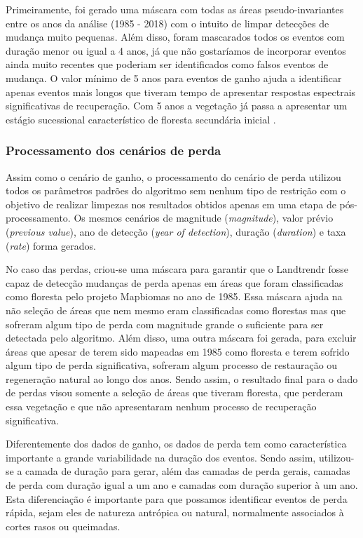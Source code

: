 \documentclass[12pt,a4paper]{article}
\begin{document}
Primeiramente, foi gerado uma máscara com todas as áreas pseudo-invariantes entre os anos da análise (1985 - 2018) com o intuito de limpar detecções de mudança muito pequenas. Além disso, foram mascarados todos os eventos com duração menor ou igual a 4 anos, já que não gostaríamos de incorporar eventos ainda muito recentes que poderiam ser identificados como falsos eventos de mudança. O valor mínimo de 5 anos para eventos de ganho ajuda a identificar apenas eventos mais longos que tiveram tempo de apresentar respostas espectrais significativas de recuperação. Com 5 anos a vegetação já passa a apresentar um estágio sucessional característico de floresta secundária inicial \citep{Chazdon2014}. 

\subsubsection{Processamento dos cenários de perda}
\hspace{13pt} Assim como o cenário de ganho, o processamento do cenário de perda utilizou todos os parâmetros padrões do algoritmo sem nenhum tipo de restrição com o objetivo de realizar limpezas nos resultados obtidos apenas em uma etapa de pós-processamento. Os mesmos cenários de magnitude (\textit{magnitude}), valor prévio (\textit{previous value}), ano de detecção (\textit{year of detection}), duração (\textit{duration}) e taxa (\textit{rate}) forma gerados.

No caso das perdas, criou-se uma máscara para garantir que o Landtrendr fosse capaz de detecção mudanças de perda apenas em áreas que foram classificadas como floresta pelo projeto Mapbiomas no ano de 1985. Essa máscara ajuda na não seleção de áreas que nem mesmo eram classificadas como florestas mas que sofreram algum tipo de perda com magnitude grande o suficiente para ser detectada pelo algoritmo. Além disso, uma outra máscara foi gerada, para excluir áreas que apesar de terem sido mapeadas em 1985 como floresta e terem sofrido algum tipo de perda significativa, sofreram algum processo de restauração ou regeneração natural ao longo dos anos. Sendo assim, o resultado final para o dado de perdas visou somente a seleção de áreas que tiveram floresta, que perderam essa vegetação e que não apresentaram nenhum processo de recuperação significativa.

Diferentemente dos dados de ganho, os dados de perda tem como característica importante a grande variabilidade na duração dos eventos. Sendo assim, utilizou-se a camada de duração para gerar, além das camadas de perda gerais, camadas de perda com duração igual a um ano e camadas com duração superior à um ano. Esta diferenciação é importante para que possamos identificar eventos de perda rápida, sejam eles de natureza antrópica ou natural, normalmente associados à cortes rasos ou queimadas. 
\end{document}
